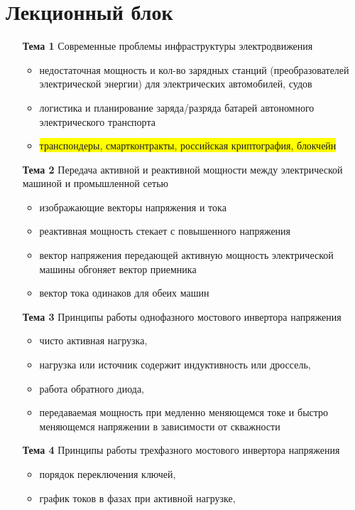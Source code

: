 \newpage
\section{Лекционный блок}
\begin{itemize}
\item[\bf{Тема 1}]{Современные проблемы инфраструктуры электродвижения}
      \begin{itemize}
          \item недостаточная мощность и кол-во зарядных станций (преобразователей электрической энергии) для электрических автомобилей, судов
          \item логистика и планирование заряда/разряда батарей автономного электрического транспорта
          \item \colorbox{yellow}{транспондеры, смартконтракты, российская криптография, блокчейн}
       \end{itemize}
\item[\bf{Тема 2}]{Передача активной и реактивной мощности между электрической машиной и промышленной сетью}
      \begin{itemize}
        \item изображающие векторы напряжения и тока
        \item реактивная мощность стекает с повышенного напряжения
        \item вектор напряжения передающей активную мощность электрической машины обгоняет вектор приемника
        \item вектор тока одинаков для обеих машин
      \end{itemize}
\item[\bf{Тема 3}]{Принципы работы однофазного мостового инвертора напряжения}
     \begin{itemize}
        \item   чисто активная нагрузка,
        \item нагрузка или источник содержит индуктивность или дроссель,
        \item работа обратного диода,
        \item передаваемая мощность при медленно меняющемся токе и быстро меняющемся напряжении в зависимости от скважности
      \end{itemize}
\item[\bf{Тема 4}]{Принципы работы трехфазного мостового инвертора напряжения}
  \begin{itemize}
   \item порядок переключения ключей,
   \item график токов в фазах при активной нагрузке,

\end{itemize}
\end{itemize}
